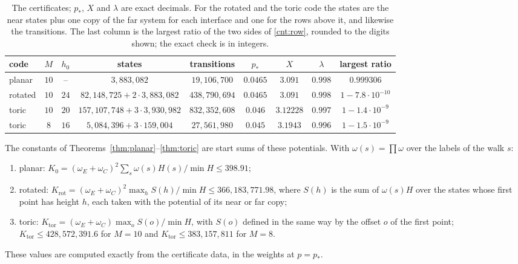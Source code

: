 \documentclass[11pt]{amsart}
\theoremstyle{definition}
\theoremstyle{remark}
\numberwithin{equation}{section}
\begin{document}
\begin{table}[ht]
\centering
\small
\begin{tabular}{@{}lcccccccc@{}}
\toprule
code & $M$ & $h_0$ & states & transitions & $p_\ast$ & $X$ & $\lambda$ & largest ratio\\
\midrule
planar & $10$ & -- & $3{,}883{,}082$ & $19{,}106{,}700$ & $0.0465$ & $3.091$ & $0.998$ & $0.999306$\\
rotated & $10$ & $24$ & $82{,}148{,}725+2\cdot3{,}883{,}082$ & $438{,}790{,}694$ & $0.0465$ & $3.091$ & $0.998$ & $1-7.8\cdot10^{-10}$\\
toric & $10$ & $20$ & $157{,}107{,}748+3\cdot3{,}930{,}982$ & $832{,}352{,}608$ & $0.046$ & $3.12228$ & $0.997$ & $1-1.4\cdot10^{-9}$\\
toric & $8$ & $16$ & $5{,}084{,}396+3\cdot159{,}004$ & $27{,}561{,}980$ & $0.045$ & $3.1943$ & $0.996$ & $1-1.5\cdot10^{-9}$\\
\bottomrule
\end{tabular}
\caption{The certificates; $p_\ast$, $X$ and $\lambda$ are exact decimals. For the rotated and the toric code the
states are the near states plus one copy of the far system for each interface and one for the rows above it, and
likewise the transitions. The last column is the largest ratio of the two sides of \eqref{cnt:row}, rounded to the
digits shown; the exact check is in integers.}
\label{cnt:tab-cert}
\end{table}

The constants of Theorems~\ref{thm:planar}--\ref{thm:toric} are start sums of these potentials. With
$\omega(s)=\prod\omega$ over the labels of the walk $s$:
\begin{enumerate}[label=(\alph*),leftmargin=2em]
\item planar: $K_0=(\omega_E+\omega_C)^2\sum_s\omega(s)H(s)/\min H\le398.91$;
\item rotated: $K_{\mathrm{rot}}=(\omega_E+\omega_C)^2\max_{h}S(h)/\min H\le366{,}183{,}771.98$, where $S(h)$ is the sum of
  $\omega(s)H$ over the states whose first point has height $h$, each taken with the potential of its near or far copy;
\item toric: $K_{\mathrm{tor}}=(\omega_E+\omega_C)\max_{o}S(o)/\min H$, with $S(o)$ defined in the same way by the
  offset $o$ of the first point; $K_{\mathrm{tor}}\le428{,}572{,}391.6$ for $M=10$ and $K_{\mathrm{tor}}\le383{,}157{,}811$
  for $M=8$.
\end{enumerate}
These values are computed exactly from the certificate data, in the weights at $p=p_\ast$.
\end{document}

